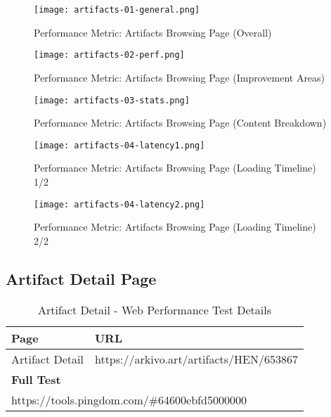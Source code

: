 \begin{figure}[H]
    \centering
    \texttt{[image: artifacts-01-general.png]}
    \caption[Performance Metric: Artifacts Browsing Page (Overall)]{Performance Metric: Artifacts Browsing Page (Overall)}
    \label{fig:artifacts-01-general}
\end{figure}

\begin{figure}[H]
    \centering
    \texttt{[image: artifacts-02-perf.png]}
    \caption[Performance Metric: Artifacts Browsing Page (Improvement Areas)]{Performance Metric: Artifacts Browsing Page (Improvement Areas)}
    \label{fig:artifacts-02-perf.png}
\end{figure}

\begin{figure}[H]
    \centering
    \texttt{[image: artifacts-03-stats.png]}
    \caption[Performance Metric: Artifacts Browsing Page (Content Breakdown)]{Performance Metric: Artifacts Browsing Page (Content Breakdown)}
    \label{fig:artifacts-03-stats.png}
\end{figure}

\begin{figure}[H]
    \centering
    \texttt{[image: artifacts-04-latency1.png]}
    \caption[Performance Metric: Artifacts Browsing Page (Loading Timeline) 1/2]{Performance Metric: Artifacts Browsing Page (Loading Timeline) 1/2}
    \label{fig:artifacts-04-latency.png}
\end{figure}

\begin{figure}[H]
    \centering
    \texttt{[image: artifacts-04-latency2.png]}
    \caption[Performance Metric: Artifacts Browsing Page (Loading Timeline) 2/2]{Performance Metric: Artifacts Browsing Page (Loading Timeline) 2/2}
    \label{fig:artifacts-04-latency.png}
\end{figure}


\subsection{Artifact Detail Page}

\begin{table}[h]
\footnotesize
\centering
\begin{tabular}{|ll|}
\hline
\multicolumn{1}{|l|}{\textbf{Page}} & \textbf{URL}                                                 \\ \hline
\multicolumn{1}{|l|}{Artifact Detail}         & \multicolumn{1}{r|}{https://arkivo.art/artifacts/HEN/653867} \\ \hline
\multicolumn{2}{|l|}{\textbf{Full Test}}                                                                    \\ \hline
\multicolumn{2}{|l|}{https://tools.pingdom.com/\#64600ebfd5000000}                                 \\ \hline
\end{tabular}
\caption{Artifact Detail - Web Performance Test Details}
\label{table:artifact-test-details}
\end{table}

